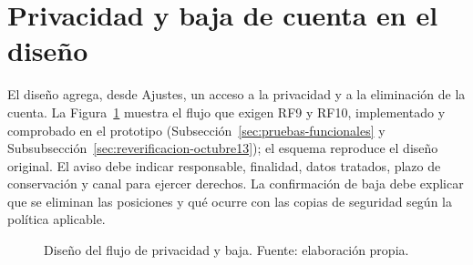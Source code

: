 \section*{Privacidad y baja de cuenta en el diseño}
El diseño agrega, desde Ajustes, un acceso a la privacidad y a la eliminación de la cuenta. La Figura~\ref{fig:wf-privacidad} muestra el flujo que exigen RF9 y RF10, implementado y comprobado en el prototipo (Subsección~\ref{sec:pruebas-funcionales} y Subsubsección~\ref{sec:reverificacion-octubre13}); el esquema reproduce el diseño original. El aviso debe indicar responsable, finalidad, datos tratados, plazo de conservación y canal para ejercer derechos. La confirmación de baja debe explicar que se eliminan las posiciones y qué ocurre con las copias de seguridad según la política aplicable.
\begin{figure}[ht]\centering
{}
\caption{Diseño del flujo de privacidad y baja. Fuente: elaboración propia.}\label{fig:wf-privacidad}
\end{figure}

